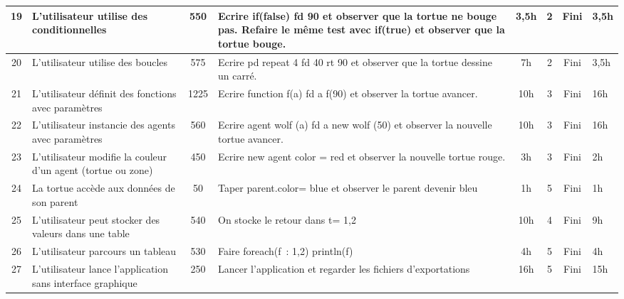 {\begin{longtable}[c]{|c|p{1.3cm}|c|p{3.5cm}|*{3}{c|}p{0.7cm}|}
\hline
19 & L'utilisateur utilise des conditionnelles & 550 & Ecrire if(false) { fd 90 } et observer que la tortue ne bouge pas. Refaire le même test avec if(true) et observer que la tortue bouge. & 3,5h & 2 & Fini & 3,5h \\
\hline
20 & L'utilisateur utilise des boucles & 575 & Ecrire pd repeat 4 { fd 40 rt 90 } et observer que la tortue dessine un carré. & 7h & 2 & Fini & 3,5h \\
\hline
21 & L'utilisateur définit des fonctions avec paramètres & 1225 & Ecrire function f(a) { fd a } f(90) et observer la tortue avancer. & 10h & 3 & Fini & 16h \\
\hline
22 & L'utilisateur instancie des agents avec paramètres & 560 & Ecrire agent wolf (a) { fd a } new wolf (50) et observer la nouvelle tortue avancer. & 10h & 3 & Fini & 16h \\
\hline
23 & L'utilisateur modifie la couleur d'un agent (tortue ou zone) & 450 & Ecrire new agent { color = red } et observer la nouvelle tortue rouge. & 3h & 3 & Fini & 2h \\
\hline
24 & La tortue accède aux données de son parent & 50 & Taper parent.color= blue et observer le parent devenir bleu & 1h & 5 & Fini & 1h \\
\hline
25 & L'utilisateur peut stocker des valeurs dans une table & 540 & On stocke le retour dans t= {1,2} & 10h & 4 & Fini & 9h \\
\hline
26 & L'utilisateur parcours un tableau & 530 & Faire foreach(f~: {1,2}) println(f) & 4h & 5 & Fini & 4h \\
\hline
27 & L'utilisateur lance l'application sans interface graphique & 250 & Lancer l'application et regarder les fichiers d'exportations & 16h & 5 & Fini & 15h \\
\hline
\end{longtable}}
